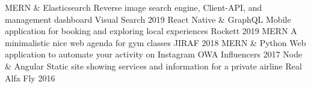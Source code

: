 \begin{cvhonors}
  \cvhonor
    {MERN \& Elasticsearch}
    {Reverse image search engine, Client-API, and management dashboard}
    {Visual Search}
    {2019}
  \cvhonor
    {React Native \& GraphQL}
    {Mobile application for booking and exploring local experiences}
    {Rockett}
    {2019}
  \cvhonor
    {MERN}
    {A minimalistic nice web agenda for gym classes}
    {JIRAF}
    {2018}
  \cvhonor
    {MERN \& Python}
    {Web application to automate your activity on Instagram}
    {OWA Influencers}
    {2017}
  \cvhonor
    {Node \& Angular}
    {Static site showing services and information for a private airline}
    {Real Alfa Fly}
    {2016}
\end{cvhonors}

